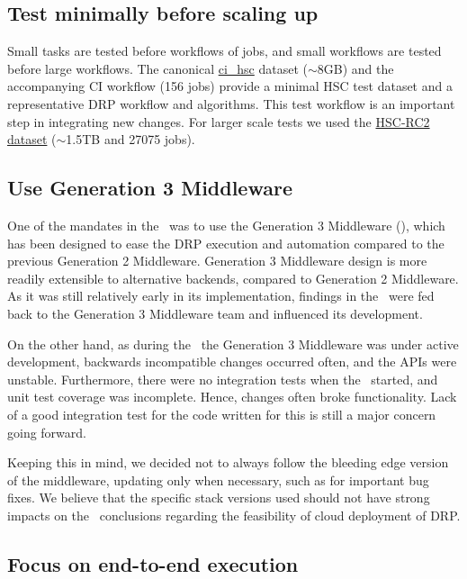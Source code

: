 \subsection{Test minimally before scaling up}

Small tasks are tested before workflows of jobs, and small workflows are tested before large workflows.
The canonical \href{https://github.com/lsst/ci\_hsc}{ci\_hsc} dataset ($\sim$8GB) and the accompanying CI workflow (156 jobs) provide a minimal HSC test dataset and a representative DRP workflow and algorithms.
This test workflow is an important step in integrating new changes.
For larger scale tests we used the \href{https://jira.lsstcorp.org/browse/DM-11345}{HSC-RC2 dataset} ($\sim$1.5TB and 27075 jobs).

\subsection{Use Generation 3 Middleware}

One of the mandates in the \poc~was to use the Generation 3 Middleware (), which has been designed to ease the DRP execution and automation compared to the previous Generation 2 Middleware.
Generation 3 Middleware design is more readily extensible to alternative backends, compared to Generation 2 Middleware.
As it was still relatively early in its implementation, findings in the \poc~were fed back to the Generation 3 Middleware team and influenced its development.

On the other hand, as during the \poc~the Generation 3 Middleware was under active development, backwards incompatible changes occurred often, and the APIs were unstable.
Furthermore, there were no integration tests when the \poc~started, and unit test coverage was incomplete.
Hence, changes often broke functionality.
Lack of a good integration test for the code written for this \poc is still a major concern going forward.

Keeping this in mind, we decided not to always follow the bleeding edge version of the middleware, updating only when necessary, such as for important bug fixes.
We believe that the specific stack versions used should not have strong impacts on the \poc~conclusions regarding the feasibility of cloud deployment of DRP.

\subsection{Focus on end-to-end execution}

